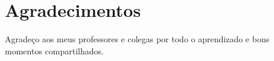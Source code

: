 \section*{Agradecimentos}

Agradeço aos meus professores e colegas por todo o aprendizado e bons momentos compartilhados.

\pagebreak
